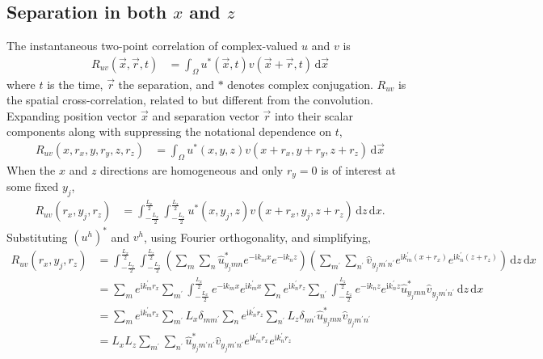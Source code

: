 \documentclass[letterpaper,11pt,nointlimits,reqno]{amsart}
\newcommand{\ii}{\ensuremath{\mathrm{i}}}
\begin{document}
\subsection{Separation in both $x$ and $z$}
The instantaneous two-point correlation of complex-valued $u$ and $v$ is
\begin{align}
R_{uv} \left( \vec{x}, \vec{r}, t \right)
  &= \int_\Omega
     u^\ast\left(\vec{x}          , t\right)
     v     \left(\vec{x} + \vec{r}, t\right)
     \,\mathrm{d}\vec{x}
\end{align}
where $t$ is the time, $\vec{r}$ the separation, and $\ast$ denotes complex
conjugation.  $R_{uv}$ is the spatial cross-correlation, related to but
different from the convolution.  Expanding position vector $\vec{x}$ and
separation vector $\vec{r}$ into their scalar components along with suppressing
the notational dependence on $t$,
\begin{align}
R_{uv} \left( x, r_x, y, r_y, z, r_z \right)
  &= \int_\Omega
     u^\ast\left( x      , y      , z       \right)
     v     \left( x + r_x, y + r_y, z + r_z \right)
     \,\mathrm{d}\vec{x}
\end{align}
When the $x$ and $z$ directions are homogeneous and only $r_y=0$ is of interest
at some fixed $y_j$,
\begin{align}
R_{uv} \left( r_x, y_j, r_z \right)
  &= \int_{-\frac{L_x}{2}}^{\frac{L_x}{2}}
     \int_{-\frac{L_z}{2}}^{\frac{L_z}{2}}
       u^\ast\left( x      , y_j, z       \right)
       v     \left( x + r_x, y_j, z + r_z \right)
     \,\mathrm{d}z
     \,\mathrm{d}x.
\end{align}
Substituting $(u^h)^\ast$ and $v^h$, using Fourier orthogonality, and
simplifying,
\begin{align}
R_{uv} \left( r_x, y_j, r_z \right)
  &= \int_{-\frac{L_x}{2}}^{\frac{L_x}{2}}
     \int_{-\frac{L_z}{2}}^{\frac{L_z}{2}}
        \left(
         \sum_{m}\sum_{n}
         \hat{u}^\ast_{y_j m n}
         e^{-\ii k_m x}e^{-\ii k_n z}
       \right)
       \left(
         \sum_{m^\prime}\sum_{n^\prime}
         \hat{v}_{y_j m^\prime n^\prime}
         e^{\ii k_m^\prime \left(x+r_x\right)}e^{\ii k_n^\prime \left(z+r_z\right)}
       \right)
     \,\mathrm{d}z
     \,\mathrm{d}x
\\
  &= \sum_{m}
     e^{\ii k_m^\prime r_x}
     \sum_{m^\prime}
     \int_{-\frac{L_x}{2}}^{\frac{L_x}{2}}
     e^{-\ii k_m x} e^{\ii k_m^\prime x}
     \sum_{n}
     e^{\ii k_n^\prime r_z}
     \sum_{n^\prime}
     \int_{-\frac{L_z}{2}}^{\frac{L_z}{2}}
     e^{-\ii k_n z} e^{\ii k_n^\prime z}
     \hat{u}^\ast_{y_j m n}
     \hat{v}_{y_j m^\prime n^\prime}
     \,\mathrm{d}z
     \,\mathrm{d}x
\\
  &= \sum_{m}
     e^{\ii k_m^\prime r_x}
     \sum_{m^\prime}
     L_x \delta_{m m^\prime}
     \sum_{n}
     e^{\ii k_n^\prime r_z}
     \sum_{n^\prime}
     L_z \delta_{n n^\prime}
     \hat{u}^\ast_{y_j m n}
     \hat{v}_{y_j m^\prime n^\prime}
\\
  &= L_x L_z
     \sum_{m^\prime}
     \sum_{n^\prime}
     \hat{u}^\ast_{y_j m^\prime n^\prime}
     \hat{v}_{y_j m^\prime n^\prime}
     e^{\ii k_m^\prime r_x}
     e^{\ii k_n^\prime r_z}
    \label{eq:twopointxz_physical}
\end{align}
\end{document}
